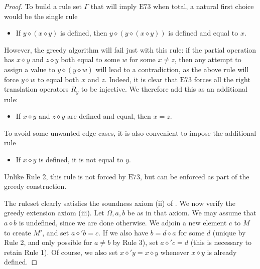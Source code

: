\documentclass[10pt,a4paper]{amsart}
\newcommand{\Eq}[1]{\mathrm{E}#1}
\newcommand{\op}{\diamond}
\begin{document}
\begin{proof} To build a rule set $\Gamma$ that will imply $\Eq{73}$ when total, a natural first choice would be the single rule
\begin{itemize}
\item[1.] If $y \op (x \op y)$ is defined, then $y \op (y \op (x \op y))$ is defined and equal to $x$.
\end{itemize}
However, the greedy algorithm will fail just with this rule: if the partial operation has $x \op y$ and $z \op y$ both equal to some $w$ for some $x \neq z$, then any attempt to assign a value to $y \op (y \op w)$ will lead to a contradiction, as the above rule will force $y \op w$ to equal both $x$ and $z$.  Indeed, it is clear that $\Eq{73}$ forces all the right translation operators $R_y$ to be injective.  We therefore add this as an additional rule:
\begin{itemize}
\item[2.] If $x \op y$ and $z \op y$ are defined and equal, then $x=z$.
\end{itemize}
To avoid some unwanted edge cases, it is also convenient to impose the additional rule
\begin{itemize}
  \item[3.] If $x \op y$ is defined, it is not equal to $y$.
\end{itemize}
Unlike Rule 2, this rule is not forced by $\Eq{73}$, but can be enforced as part of the greedy construction.

The ruleset clearly satisfies the soundness axiom (ii) of .  We now verify the greedy extension axiom (iii).  Let $\Omega,a,b$ be as in that axiom. We may assume that $a \op b$ is undefined, since we are done otherwise. We adjoin a new element $c$ to $M$ to create $M'$, and set $a \op' b = c$.  If we also have $b = d \op a$ for some $d$ (unique by Rule 2, and only possible for $a \neq b$ by Rule 3), set $a \op' c = d$ (this is necessary to retain Rule 1).  Of course, we also set $x \op' y = x \op y$ whenever $x \op y$ is already defined.


\end{proof}
\end{document}

